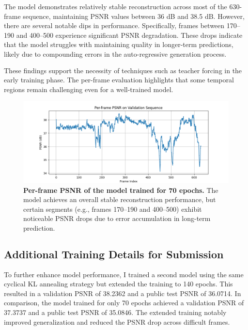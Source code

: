 \documentclass[twocolumn,a4paper]{article}
\begin{document}
The model demonstrates relatively stable reconstruction across most of the 630-frame sequence, maintaining PSNR values between 36 dB and 38.5 dB. However, there are several notable dips in performance. Specifically, frames between 170–190 and 400–500 experience significant PSNR degradation. These drops indicate that the model struggles with maintaining quality in longer-term predictions, likely due to compounding errors in the auto-regressive generation process.

These findings support the necessity of techniques such as teacher forcing in the early training phase. The per-frame evaluation highlights that some temporal regions remain challenging even for a well-trained model.

\begin{figure}[H]
\centering
\includegraphics[width=0.95\linewidth]{figures/val_70_frame_psnr}
\caption{\textbf{Per-frame PSNR of the model trained for 70 epochs.} The model achieves an overall stable reconstruction performance, but certain segments (e.g., frames 170–190 and 400–500) exhibit noticeable PSNR drops due to error accumulation in long-term prediction.}
\label{fig:val70framepsnr}
\end{figure}

\subsection{Additional Training Details for Submission}

To further enhance model performance, I trained a second model using the same cyclical KL annealing strategy but extended the training to 140 epochs. This resulted in a validation PSNR of 38.2362 and a public test PSNR of 36.0714. In comparison, the model trained for only 70 epochs achieved a validation PSNR of 37.3737 and a public test PSNR of 35.0846. The extended training notably improved generalization and reduced the PSNR drop across difficult frames.
\end{document}
